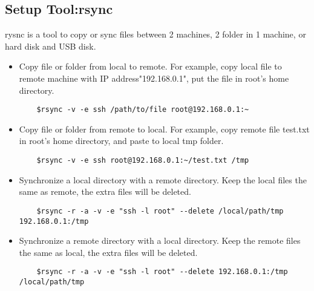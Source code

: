 \documentclass{article}
\begin{document}
\subsection{Setup Tool:rsync}
rysnc is a tool to copy or sync files between 2 machines, 2 folder in 1 machine, or hard disk and USB disk.\\
\begin{itemize}
    \item
    Copy file or folder from local to remote. For example, copy local file to remote machine with IP address"192.168.0.1", put the file in root's home directory.\\
    \begin{lstlisting}
    $rsync -v -e ssh /path/to/file root@192.168.0.1:~
    \end{lstlisting}
    \item
    Copy file or folder from remote to local. For example, copy remote file test.txt in root's home directory, and paste to local tmp folder. 
    \begin{lstlisting}
    $rsync -v -e ssh root@192.168.0.1:~/test.txt /tmp 
    \end{lstlisting}
    \item
     Synchronize a local directory with a remote directory. Keep the local files the same as remote, the extra files will be deleted. 
    \begin{lstlisting}
    $rsync -r -a -v -e "ssh -l root" --delete /local/path/tmp 192.168.0.1:/tmp
    \end{lstlisting}
    \item
    Synchronize a remote directory with a local directory. Keep the remote files the same as local, the extra files will be deleted. 
    \begin{lstlisting}
    $rsync -r -a -v -e "ssh -l root" --delete 192.168.0.1:/tmp /local/path/tmp
    \end{lstlisting}
\end{itemize}
\end{document}
